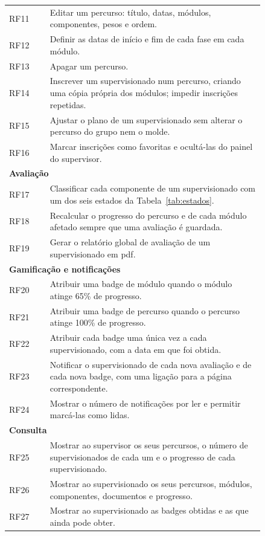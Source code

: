 \begin{longtable}{lp{0.84\linewidth}}
RF11 & Editar um percurso: título, datas, módulos, componentes, pesos e ordem. \\
RF12 & Definir as datas de início e fim de cada fase em cada módulo. \\
RF13 & Apagar um percurso. \\
RF14 & Inscrever um supervisionado num percurso, criando uma cópia própria dos módulos; impedir inscrições repetidas. \\
RF15 & Ajustar o plano de um supervisionado sem alterar o percurso do grupo nem o molde. \\
RF16 & Marcar inscrições como favoritas e ocultá-las do painel do supervisor. \\
\midrule
\multicolumn{2}{l}{\textbf{Avaliação}} \\
RF17 & Classificar cada componente de um supervisionado com um dos seis estados da Tabela~\ref{tab:estados}. \\
RF18 & Recalcular o progresso do percurso e de cada módulo afetado sempre que uma avaliação é guardada. \\
RF19 & Gerar o relatório global de avaliação de um supervisionado em \gls{pdf}. \\
\midrule
\multicolumn{2}{l}{\textbf{Gamificação e notificações}} \\
RF20 & Atribuir uma badge de módulo quando o módulo atinge 65\% de progresso. \\
RF21 & Atribuir uma badge de percurso quando o percurso atinge 100\% de progresso. \\
RF22 & Atribuir cada badge uma única vez a cada supervisionado, com a data em que foi obtida. \\
RF23 & Notificar o supervisionado de cada nova avaliação e de cada nova badge, com uma ligação para a página correspondente. \\
RF24 & Mostrar o número de notificações por ler e permitir marcá-las como lidas. \\
\midrule
\multicolumn{2}{l}{\textbf{Consulta}} \\
RF25 & Mostrar ao supervisor os seus percursos, o número de supervisionados de cada um e o progresso de cada supervisionado. \\
RF26 & Mostrar ao supervisionado os seus percursos, módulos, componentes, documentos e progresso. \\
RF27 & Mostrar ao supervisionado as badges obtidas e as que ainda pode obter. \\
\end{longtable}
\endgroup

